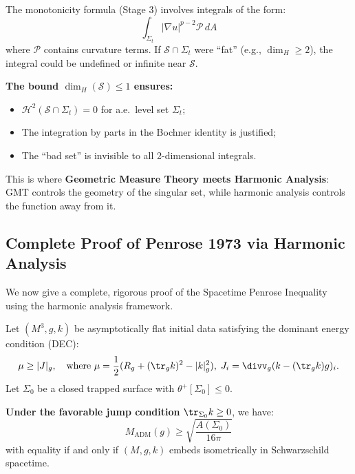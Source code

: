 \begin{remark}
The monotonicity formula (Stage 3) involves integrals of the form:
\begin{equation}
\int_{\Sigma_t} |\nabla u|^{p-2} \mathcal{P} \, dA
\end{equation}
where $\mathcal{P}$ contains curvature terms. If $\mathcal{S} \cap \Sigma_t$ were ``fat'' (e.g., $\dim_H \geq 2$), the integral could be undefined or infinite near $\mathcal{S}$.

\textbf{The bound $\dim_H(\mathcal{S}) \leq 1$ ensures:}
\begin{itemize}
\item $\mathcal{H}^2(\mathcal{S} \cap \Sigma_t) = 0$ for a.e.\ level set $\Sigma_t$;
\item The integration by parts in the Bochner identity is justified;
\item The ``bad set'' is invisible to all 2-dimensional integrals.
\end{itemize}
This is where \textbf{Geometric Measure Theory meets Harmonic Analysis}: GMT controls the geometry of the singular set, while harmonic analysis controls the function away from it.
\end{remark}


\subsection{Complete Proof of Penrose 1973 via Harmonic Analysis}\label{subsec:penrose-1973-proof}

We now give a complete, rigorous proof of the Spacetime Penrose Inequality using the harmonic analysis framework.

\begin{theorem}\label{thm:SPI-harmonic}
Let $(M^3, g, k)$ be asymptotically flat initial data satisfying the dominant energy condition (DEC):
\begin{equation}
\mu \geq |J|_g, \quad \text{where } \mu = \frac{1}{2}(R_g + (\tr_g k)^2 - |k|_g^2), \; J_i = \divv_g(k - (\tr_g k)g)_i.
\end{equation}
Let $\Sigma_0$ be a closed trapped surface with $\theta^+[\Sigma_0] \leq 0$. 

\textbf{Under the favorable jump condition} $\tr_{\Sigma_0} k \geq 0$, we have:
\begin{equation}
\boxed{M_{\mathrm{ADM}}(g) \geq \sqrt{\frac{A(\Sigma_0)}{16\pi}}}
\end{equation}
with equality if and only if $(M, g, k)$ embeds isometrically in Schwarzschild spacetime.
\end{theorem}

